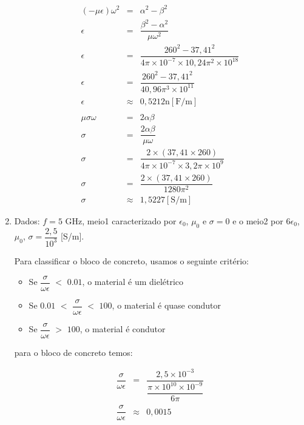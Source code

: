 \begin{enumerate}[1.]
\begin{eqnarray*}
(-\mu\epsilon)\omega^{2} & = & \alpha^{2} - \beta^{2} \\
\epsilon & = & \dfrac{\beta^{2} - \alpha^{2}}{\mu\omega^{2}} \\
\epsilon & = & \dfrac{260^{2} - 37,41^{2}}{4\pi \times 10^{-7} \times 10,24\pi^{2} \times 10^{18}} \\
\epsilon & = & \dfrac{260^{2} - 37,41^{2}}{40,96\pi^{3} \times 10^{11}} \\ 
\epsilon & \approx & 0,5212\si{\nano}[\si{\farad/\meter}] \\
& & \\
\mu\sigma\omega & = & 2\alpha\beta \\
\sigma & = & \dfrac{2\alpha\beta}{\mu\omega} \\
\sigma & = & \dfrac{2 \times (37,41 \times 260)}{4\pi \times 10^{-7} \times 3,2\pi \times 10^{9}} \\
\sigma & = & \dfrac{2 \times (37,41 \times 260)}{1280\pi^{2}} \\
\sigma & \approx & 1,5227 [\si{\siemens/\meter}]
\end{eqnarray*}

\newpage

\item Dados: $f = 5$ \si{\giga\hertz}, meio1 caracterizado por $\epsilon_{0}$, $\mu_{0}$ e $\sigma = 0$ e o meio2 por $6 \epsilon_{0}$, $\mu_{0}$, $\sigma = \dfrac{2,5}{10^{3}}$ [\si{\siemens/\meter}]. %

Para classificar o bloco de concreto, usamos o seguinte critério:
\begin{itemize}
  {\setlength\itemindent{25pt}}\item Se $\dfrac{\sigma}{\omega \epsilon}$ $<$ $0.01$, o material é um dielétrico
  {\setlength\itemindent{25pt}}\item Se $0.01$ $<$ $\dfrac{\sigma}{\omega \epsilon}$ $<$ $100$, o material é quase condutor
  {\setlength\itemindent{25pt}}\item Se $\dfrac{\sigma}{\omega \epsilon}$ $>$ $100$, o material é condutor
\end{itemize}

para o bloco de concreto temos:

\begin{eqnarray*}
  \dfrac{\sigma}{\omega \epsilon} & = & \dfrac{2,5 \times 10^{-3}}{\dfrac{\pi \times 10^{10} \times 10^{-9}}{6\pi}} \nonumber \\
  \dfrac{\sigma}{\omega \epsilon} & \approx & 0,0015 \nonumber
\end{eqnarray*}


\end{enumerate}
